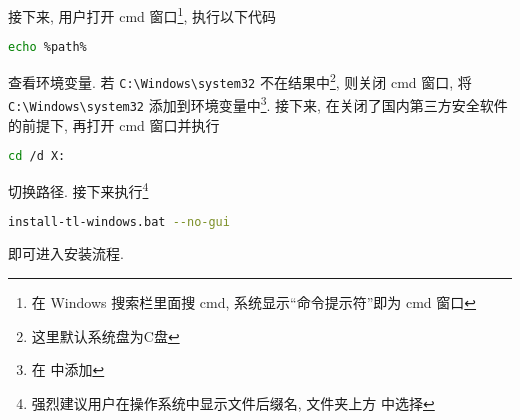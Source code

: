 \documentclass{ctexrep}
\begin{document}
接下来, 用户打开 \textsf{cmd} 窗口\footnote{在 Windows 搜索栏里面搜 cmd, 系统显示“命令提示符”即为 \textsf{cmd} 窗口}, 执行以下代码
\begin{lstlisting}[language = bash]
  echo %path%
\end{lstlisting}
查看环境变量. 
若 \texttt{C:\textbackslash Windows\textbackslash system32} 不在结果中\footnote{这里默认系统盘为\textsf{C}盘}, 则关闭 \textsf{cmd} 窗口, 将 \texttt{C:\textbackslash Windows\textbackslash system32} 添加到环境变量中\footnote{在  中添加}. 
接下来, 在关闭了国内第三方安全软件的前提下, 再打开 \textsf{cmd} 窗口并执行
\begin{lstlisting}[language = bash]
  cd /d X:
\end{lstlisting}
切换路径. 
接下来执行\footnote{强烈建议用户在操作系统中显示文件后缀名, 文件夹上方  中选择 }
\begin{lstlisting}[language = bash]
  install-tl-windows.bat --no-gui
\end{lstlisting}
即可进入安装流程. 
\end{document}
